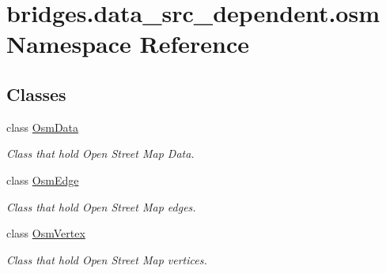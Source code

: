 \hypertarget{namespacebridges_1_1data__src__dependent_1_1osm}{}\section{bridges.\+data\+\_\+src\+\_\+dependent.\+osm Namespace Reference}
\label{namespacebridges_1_1data__src__dependent_1_1osm}
\subsection*{Classes}
\begin{DoxyCompactItemize}
\item 
class \hyperlink{classbridges_1_1data__src__dependent_1_1osm_1_1_osm_data}{Osm\+Data}
\begin{DoxyCompactList}\small\item\em Class that hold Open Street Map Data. \end{DoxyCompactList}\item 
class \hyperlink{classbridges_1_1data__src__dependent_1_1osm_1_1_osm_edge}{Osm\+Edge}
\begin{DoxyCompactList}\small\item\em Class that hold Open Street Map edges. \end{DoxyCompactList}\item 
class \hyperlink{classbridges_1_1data__src__dependent_1_1osm_1_1_osm_vertex}{Osm\+Vertex}
\begin{DoxyCompactList}\small\item\em Class that hold Open Street Map vertices. \end{DoxyCompactList}\end{DoxyCompactItemize}
